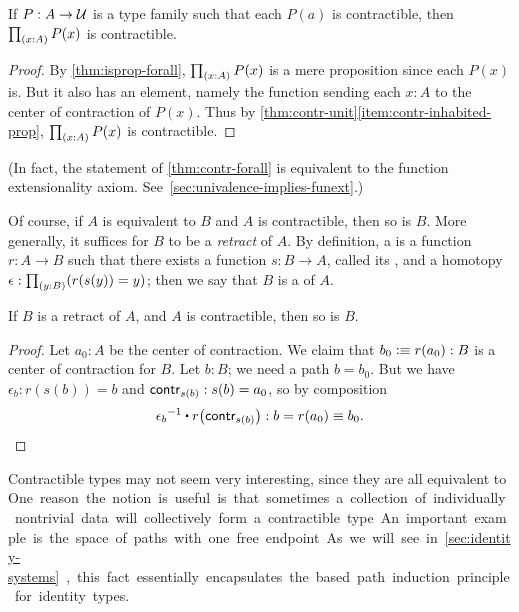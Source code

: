 \begin{lem}\label{thm:contr-forall}
  If $P:A\to\mathcal{U}$ is a type family such that each $P(a)$ is contractible, then $\prd{x:A} P(x)$ is contractible.
\end{lem}
\begin{proof}
  By \cref{thm:isprop-forall}, $\prd{x:A} P(x)$ is a mere proposition since each $P(x)$ is.
  But it also has an element, namely the function sending each $x:A$ to the center of contraction of $P(x)$.
  Thus by \cref{thm:contr-unit}\ref{item:contr-inhabited-prop}, $\prd{x:A} P(x)$ is contractible.
\end{proof}

%
(In fact, the statement of \cref{thm:contr-forall} is equivalent to the function extensionality axiom.
See~\cref{sec:univalence-implies-funext}.)

Of course, if $A$ is equivalent to $B$ and $A$ is contractible, then so is $B$.
More generally, it suffices for $B$ to be a \emph{retract} of $A$.
By definition, a 
%
%
is a function $r : A \to B$ such that there exists a function $s : B \to A$, called its ,
%
%
and a homotopy $\epsilon:\prd{y:B} (r(s(y))=y)$; then we say that $B$ is a %
of $A$.

\begin{lem}\label{thm:retract-contr}
  If $B$ is a retract of $A$, and $A$ is contractible, then so is $B$.
\end{lem}
\begin{proof}
  Let $a_0 : A$ be the center of contraction.
  We claim that $b_0 \vcentcolon\equiv r(a_0) : B$ is a center of contraction for $B$.
  Let $b : B$; we need a path $b = b_0$.
  But we have $\epsilon_b : r(s(b)) = b$ and $\mathsf{contr}_{s(b)} : s(b) = a_0$, so by composition
  \[ \opp{\epsilon_b} \ct \ap{r}{\contr_{s(b)}} : b = r(a_0) \jdeq b_0. \qedhere\]
\end{proof}

Contractible types may not seem very interesting, since they are all equivalent to \unit.
One reason the notion is useful is that sometimes a collection of individually nontrivial data will collectively form a contractible type.
An important example is the space of paths with one free endpoint.
As we will see in \cref{sec:identity-systems}, this fact essentially
encapsulates the based path induction principle for identity types.


